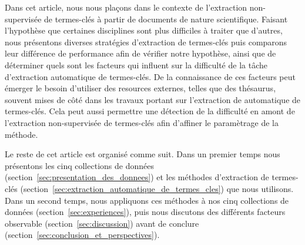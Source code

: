   Dans cet article, nous nous plaçons dans le contexte de l'extraction
  non-supervisée de termes-clés à partir de documents de nature scientifique.
  Faisant l'hypothèse que certaines disciplines sont plus difficiles à traiter
  que d'autres, nous présentons diverses stratégies d'extraction de termes-clés
  puis comparons leur différence de performance afin de vérifier notre
  hypothèse, ainsi que de déterminer quels sont les facteurs qui influent sur la
  difficulté de la tâche d'extraction automatique de termes-clés. De la
  connaissance de ces facteurs peut émerger le besoin d'utiliser des resources
  externes, telles que des thésaurus, souvent mises de côté dans les travaux
  portant sur l'extraction de automatique de termes-clés. Cela peut aussi
  permettre une détection de la difficulté en amont de l'extraction
  non-supervisée de termes-clés afin d'affiner le paramètrage de la méthode.

  Le reste de cet article est organisé comme suit. Dans un premier temps nous
  présentons les cinq collections de données
  (section~\ref{sec:presentation_des_donnees}) et les méthodes d'extraction de
  termes-clés (section~\ref{sec:extraction_automatique_de_termes_cles}) que nous
  utilisons. Dans un second temps, nous appliquons ces méthodes à nos cinq
  collections de données (section~\ref{sec:experiences}), puis nous discutons
  des différents facteurs observable (section~\ref{sec:discussion}) avant de
  conclure (section~\ref{sec:conclusion_et_perspectives}).


